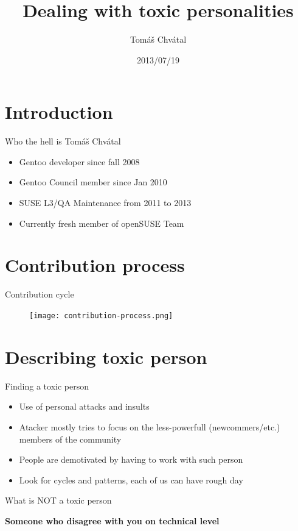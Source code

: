 \documentclass{beamer}
\author{Tom\'{a}\v{s} Chv\'{a}tal\newline {\small openSUSE Team}}
\title{Dealing with toxic personalities}
\date{2013/07/19}
\begin{document}
\begin{frame}[t,plain]
\titlepage
\end{frame}

\section{Introduction}

\begin{frame}[t]{Who the hell is Tomáš Chvátal}
	\begin{itemize}
	\item Gentoo developer since fall 2008
	\item Gentoo Council member since Jan 2010
	\item SUSE L3/QA Maintenance from 2011 to 2013
	\item Currently fresh member of openSUSE Team
	\end{itemize}
\end{frame}

\section{Contribution process}

\begin{frame}{Contribution cycle}
	\begin{figure}
	\texttt{[image: contribution-process.png]}
	\end{figure}
\end{frame}

\section{Describing toxic person}

\begin{frame}[t]{Finding a toxic person}
	\begin{itemize}
	\item Use of personal attacks and insults
	\item Atacker mostly tries to focus on the less-powerfull (newcommers/etc.) members of the community
	\item People are demotivated by having to work with such person
	\item Look for cycles and patterns, each of us can have rough day
	\end{itemize}
\end{frame}

\begin{frame}{What is NOT a toxic person}
	\begin{center}
	\textbf{Someone who disagree with you on technical level}
	\end{center}
\end{frame}
\end{document}
